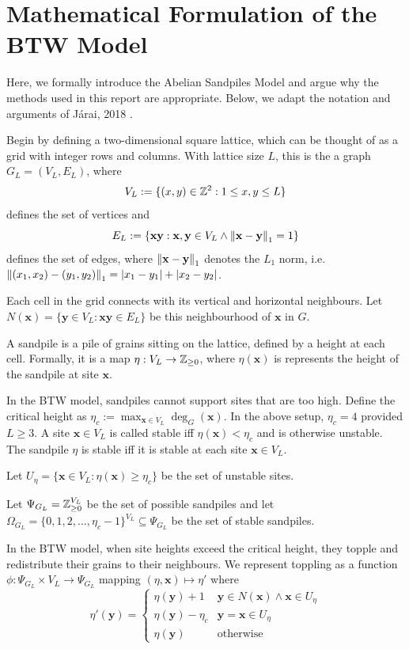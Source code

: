 
\section{Mathematical Formulation of the BTW Model}
Here, we formally introduce the Abelian Sandpiles Model and argue why the methods used in this report are appropriate. Below, we adapt the notation and arguments of Járai, 2018 \cite{jaraisandpilenotes}.

Begin by defining a two-dimensional square lattice, which can be thought of as a grid with integer rows and columns. With lattice size $L$, this is the a graph $G_L = (V_L, E_L)$, where 
\[V_L := \{(x, y) \in \mathbb{Z}^2: 1 \leq x, y \leq L\}\] 
defines the set of vertices and 
\[E_L := \{\mathbf{xy}: \mathbf{x}, \mathbf{y}\in V_L \land \left \lVert \mathbf{x}-\mathbf{y} \right \rVert_1=1\}\] 
defines the set of edges, where $\left \lVert \mathbf{x}-\mathbf{y} \right \rVert_1$ denotes the $L_1$ norm, i.e. $\left \lVert (x_1, x_2)-(y_1, y_2) \right \rVert_1 = \left| x_1 - y_1 \right| + \left| x_2 - y_2 \right|$.

Each cell in the grid connects with its vertical and horizontal neighbours. Let $N(\mathbf{x}) = \{\mathbf{y} \in V_L: \mathbf{xy} \in E_L\}$ be this neighbourhood of $\mathbf{x}$ in $G$.

A sandpile is a pile of grains sitting on the lattice, defined by a height at each cell. Formally, it is a map $\eta: V_L \to \mathbb{Z}_{\geq 0}$, where $\eta(\mathbf{x})$ is represents the height of the sandpile at site $\mathbf{x}$.

In the BTW model, sandpiles cannot support sites that are too high. Define the critical height as $\eta_c := \max_{\mathbf{x}\in V_L} \deg_G(\mathbf{x})$. In the above setup, $\eta_c = 4$ provided $L \geq 3$. A site $\mathbf{x} \in V_L$ is called stable iff $\eta(\mathbf{x}) < \eta_c$ and is otherwise unstable. The sandpile $\eta$ is stable iff it is stable at each site $\mathbf{x} \in V_L$.

Let $U_\eta = \{\mathbf{x} \in V_L: \eta(\mathbf{x}) \geq \eta_c\}$ be the set of unstable sites.

Let $\Psi_{G_L} = \mathbb{Z}_{\geq 0}^{V_L}$ be the set of possible sandpiles and let $\Omega_{G_L} = \{0, 1, 2, ..., \eta_c - 1\}^{V_L}\subseteq \Psi_{G_L}$ be the set of stable sandpiles.

In the BTW model, when site heights exceed the critical height, they topple and redistribute their grains to their neighbours. We represent toppling as a function $\phi: \Psi_{G_L} \times V_L \to \Psi_{G_L}$ mapping $(\eta, \mathbf{x}) \mapsto \eta'$ where 
\[\eta'(\mathbf{y}) = \begin{cases}
    \eta(\mathbf{y}) + 1 & \mathbf{y} \in N(\mathbf{x}) \land \mathbf{x} \in U_\eta \\
    \eta(\mathbf{y}) - \eta_c & \mathbf{y} = \mathbf{x} \in U_\eta \\
    \eta(\mathbf{y}) & \text{otherwise}
\end{cases}\]

